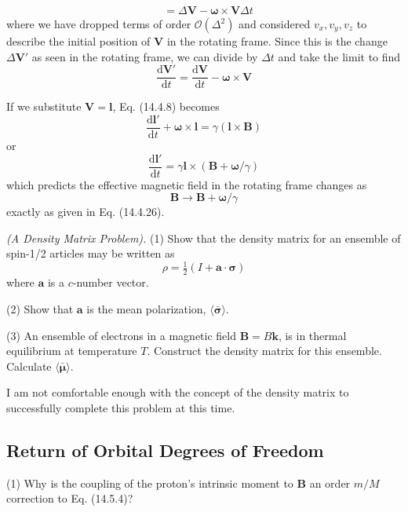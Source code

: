 \documentclass[../principles-of-quantum-mechanics.tex]{subfiles}
\begin{document}
\begin{questions}
\begin{solution}
\begin{align*}
				&= \Delta\mathbf{V} - \boldsymbol{\omega} \times \mathbf{V}\Delta t
			\end{align*}
			where we have dropped terms of order $\mathcal{O}(\Delta^2)$ and considered $v_x, v_y, v_z$ to describe the initial position of $\mathbf{V}$ in the rotating frame. Since this is the change $\Delta\mathbf{V}'$ as seen in the rotating frame, we can divide by $\Delta t$ and take the limit to find
			$$\frac{\mathrm{d}\mathbf{V}'}{\mathrm{d}t} = \frac{\mathrm{d}\mathbf{V}}{\mathrm{d}t} - \boldsymbol{\omega}\times\mathbf{V}$$
			
			If we substitute $\mathbf{V} = \mathbf{l}$, Eq. (14.4.8) becomes
			$$\frac{\mathrm{d}\mathbf{l}'}{\mathrm{d}t} + \boldsymbol{\omega}\times\mathbf{l} = \gamma(\mathbf{l}\times\mathbf{B})$$
			or
			$$\frac{\mathrm{d}\mathbf{l}'}{\mathrm{d}t} = \gamma\mathbf{l}\times(\mathbf{B} + \boldsymbol{\omega}/\gamma)$$
			which predicts the effective magnetic field in the rotating frame changes as
			$$\mathbf{B} \to \mathbf{B} + \boldsymbol{\omega}/\gamma$$
			exactly as given in Eq. (14.4.26).
		\end{solution}
		
		\question \textit{(A Density Matrix Problem).} (1) Show that the density matrix for an ensemble of spin-1/2 articles may be written as
		$$\rho = \tfrac{1}{2}(I + \mathbf{a}\cdot\boldsymbol{\sigma})$$
		where $\mathbf{a}$ is a $c$-number vector.
		
		(2) Show that $\mathbf{a}$ is the mean polarization, $\langle \bar{\boldsymbol{\sigma}}\rangle$.
		
		(3) An ensemble of electrons in a magnetic field $\mathbf{B} = B\mathbf{k}$, is in thermal equilibrium at temperature $T$. Construct the density matrix for this ensemble. Calculate $\langle \bar{\boldsymbol{\mu}}\rangle$.
		
		\begin{solution}
			\color{red}I am not comfortable enough with the concept of the density matrix to successfully complete this problem at this time.\color{black}
		\end{solution}
	
	\setcounter{subsection}{4}
	\setcounter{question}{0}
	\subsection{Return of Orbital Degrees of Freedom}
	\question (1) Why is the coupling of the proton's intrinsic moment to $\mathbf{B}$ an order $m/M$ correction to Eq. (14.5.4)?
	

\end{questions}
\end{document}
